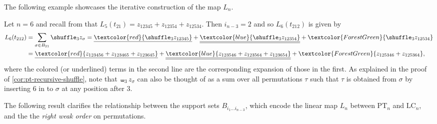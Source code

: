\documentclass[12pt, reqno]{amsart}
\numberwithin{equation}{section}
\theoremstyle{plain}
\theoremstyle{definition}
\newenvironment{example}
  {\pushQED{\qed}\renewcommand{\qedsymbol}{$\triangle$}\examplex}
  {\popQED\endexamplex}
\newcommand{\pt}{\mathrm{PT}}
\newcommand{\lc}{\mathrm{LC}}
\begin{document}
The following example showcases the iterative construction of the map $L_n$. 

\begin{example}
\label{ex:iterative-LC-to-PT}
Let $n = 6$ and recall from  that $L_5(t_{21}) = z_{12345} + z_{12354} + z_{12534}$. Then $i_{n-3} = 2$ and so $L_6(t_{212})$ is given by
\begin{align*}
L_6(t_{212}) &= \sum_{\sigma \in B_{21}} \shuffle_{3} z_\sigma =  \underline{\textcolor{red}{\shuffle_3 z_{12345}}} + \underline{\underline{\textcolor{blue}{\shuffle_3 z_{12354}}}}+ \textcolor{ForestGreen}{\shuffle_3 z_{12534}}\\
&= \underline{\textcolor{red}{z_{123456} + z_{123465} + z_{123645}}} + \underline{\underline{\textcolor{blue}{z_{123546} + z_{123564} + z_{123654}}}}  + \textcolor{ForestGreen}{z_{125346} + z_{125364}}, 
\end{align*}
where the colored (or underlined) terms in the second line are the corresponding expansion of those in the first. As explained in the proof of \cref{cor:pt-recursive-shuffle}, note that $\shuffle_{3} z_\sigma$ can also be thought of as a sum over all permutations $\tau$ such that $\tau$ is obtained from $\sigma$ by inserting $6$ in to $\sigma$ at any position after $3$. 
\end{example}


The following result clarifies the relationship between the support sets $B_{i_1 \ldots i_{n-3}}$, which encode the linear map $L_n$ between $\pt_n$  and $\lc_n$, and the the \emph{right weak order} on permutations. 
\end{document}
